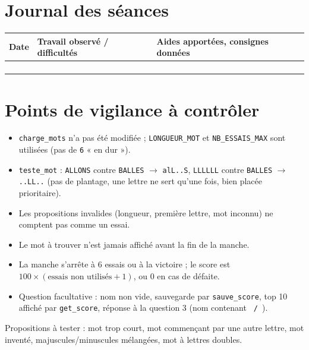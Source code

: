 \documentclass[10pt,a4paper]{article}
\begin{document}
\section*{Journal des séances}
\begin{tabularx}{\linewidth}{@{}C{2cm} X X@{}}
\toprule
{} Date & Travail observé / difficultés & Aides apportées, consignes données \\
\midrule
 & & \\[8mm]
\midrule
 & & \\[8mm]
\midrule
 & & \\[8mm]
\midrule
 & & \\[8mm]
\bottomrule
\end{tabularx}

\section*{Points de vigilance à contrôler}
\begin{itemize}
\item \texttt{charge\_\allowbreak{}mots} n'a pas été modifiée ; \texttt{LONGUEUR\_\allowbreak{}MOT} et \texttt{NB\_\allowbreak{}ESSAIS\_\allowbreak{}MAX} sont utilisées (pas de \texttt{6} « en dur »).
\item \texttt{teste\_\allowbreak{}mot} : \texttt{ALLONS} contre \texttt{BALLES} $\to$ \texttt{alL..S}, \texttt{LLLLLL} contre \texttt{BALLES} $\to$ \texttt{..LL..} (pas de plantage, une lettre ne sert qu'une fois, bien placée prioritaire).
\item Les propositions invalides (longueur, première lettre, mot inconnu) ne comptent pas comme un essai.
\item Le mot à trouver n'est jamais affiché avant la fin de la manche.
\item La manche s'arrête à 6 essais ou à la victoire ; le score est $100\times(\text{essais non utilisés}+1)$, ou 0 en cas de défaite.
\item Question facultative : nom non vide, sauvegarde par \texttt{sauve\_\allowbreak{}score}, top 10 affiché par \texttt{get\_\allowbreak{}score}, réponse à la question 3 (nom contenant \texttt{ / }).
\end{itemize}
\smallskip
Propositions à tester : mot trop court, mot commençant par une autre lettre, mot inventé, majuscules/minuscules mélangées, mot à lettres doubles.
\end{document}
